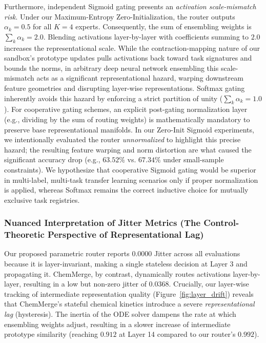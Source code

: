 Furthermore, independent Sigmoid gating presents an \emph{activation scale-mismatch risk}. Under our Maximum-Entropy Zero-Initialization, the router outputs $\alpha_{k} = 0.5$ for all $K=4$ experts. Consequently, the sum of ensembling weights is $\sum_k \alpha_k = 2.0$. Blending activations layer-by-layer with coefficients summing to $2.0$ increases the representational scale. While the contraction-mapping nature of our sandbox's prototype updates pulls activations back toward task signatures and bounds the norms, in arbitrary deep neural network ensembling this scale-mismatch acts as a significant representational hazard, warping downstream feature geometries and disrupting layer-wise representations. Softmax gating inherently avoids this hazard by enforcing a strict partition of unity ($\sum_k \alpha_k = 1.0$). For cooperative gating schemes, an explicit post-gating normalization layer (e.g., dividing by the sum of routing weights) is mathematically mandatory to preserve base representational manifolds. In our Zero-Init Sigmoid experiments, we intentionally evaluated the router \emph{unnormalized} to highlight this precise hazard; the resulting feature warping and norm distortion are what caused the significant accuracy drop (e.g., $63.52\%$ vs. $67.34\%$ under small-sample constraints). We hypothesize that cooperative Sigmoid gating would be superior in multi-label, multi-task transfer learning scenarios only if proper normalization is applied, whereas Softmax remains the correct inductive choice for mutually exclusive task registries.

\subsubsection{Nuanced Interpretation of Jitter Metrics (The Control-Theoretic Perspective of Representational Lag)}
Our proposed parametric router reports $0.0000$ Jitter across all evaluations because it is layer-invariant, making a single stateless decision at Layer 3 and propagating it. ChemMerge, by contrast, dynamically routes activations layer-by-layer, resulting in a low but non-zero jitter of $0.0368$. Crucially, our layer-wise tracking of intermediate representation quality (Figure~\ref{fig:layer_drift}) reveals that ChemMerge's stateful chemical kinetics introduce a severe \emph{representational lag} (hysteresis). The inertia of the ODE solver dampens the rate at which ensembling weights adjust, resulting in a slower increase of intermediate prototype similarity (reaching $0.912$ at Layer 14 compared to our router's $0.992$).

